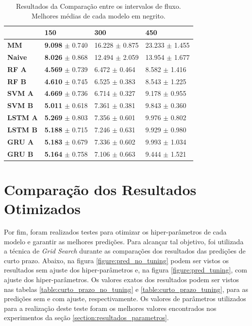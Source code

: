 \begin{table}[H]
    \begin{tabular*}{\linewidth}{@{\extracolsep{\fill}}llll}
    \toprule
     & 
    \multicolumn{1}{l}{\textbf{150}} & 
    \multicolumn{1}{l}{\textbf{300}} &
    \multicolumn{1}{l}{\textbf{450}} \\
    \midrule
    \textbf{MM} & \textbf{9.098} $\pm$ 0.740 & 16.228 $\pm$ 0.875 & 23.233 $\pm$ 1.455
    \\
    \midrule
    \textbf{Naive} & \textbf{8.026} $\pm$ 0.868 & 12.494 $\pm$ 2.059 & 13.954 $\pm$ 1.677
    \\
    \midrule
    \textbf{RF A} & \textbf{4.569} $\pm$ 0.739 & 6.472 $\pm$ 0.464 & 8.582 $\pm$ 1.416
    \\
    \midrule
    \textbf{RF B} & \textbf{4.610} $\pm$ 0.745 & 6.525 $\pm$ 0.383 & 8.543 $\pm$ 1.225
    \\
    \midrule
    \textbf{SVM A} & \textbf{4.669} $\pm$ 0.736 & 6.714 $\pm$ 0.327 & 9.178 $\pm$ 0.955
    \\
    \midrule
    \textbf{SVM B} & \textbf{5.011} $\pm$ 0.618 & 7.361 $\pm$ 0.381 & 9.843 $\pm$ 0.360
    \\
    \midrule
    \textbf{LSTM A} & \textbf{5.269} $\pm$ 0.803 & 7.356 $\pm$ 0.601 & 9.976 $\pm$ 0.802
    \\
    \midrule
    \textbf{LSTM B} & \textbf{5.188} $\pm$ 0.715 & 7.246 $\pm$ 0.631 & 9.929 $\pm$ 0.980
    \\
    \midrule
    \textbf{GRU A} & \textbf{5.183} $\pm$ 0.679 & 7.336 $\pm$ 0.602 & 9.993 $\pm$ 1.034
    \\
    \midrule
    \textbf{GRU B} & \textbf{5.164} $\pm$ 0.758 & 7.106 $\pm$ 0.663 & 9.444 $\pm$ 1.521
    \\
    \bottomrule
    \end{tabular*}
    \label{table:res_flow}
    \caption{Resultados da Comparação entre os intervalos de fluxo. Melhores médias de cada modelo em negrito.}
\end{table}

\section{Comparação dos Resultados Otimizados}

 Por fim, foram realizados testes para otimizar os hiper-parâmetros de cada modelo e garantir as melhores predições. Para alcançar tal objetivo, foi utilizada a técnica de \textit{Grid Search} durante as comparações dos resultados das predições de curto prazo. Abaixo, na figura \ref{figure:pred_no_tuning} podem ser vistos os resultados sem ajuste dos hiper-parâmetros e, na figura \ref{figure:pred_tuning}, com ajuste dos hiper-parâmetros. Os valores exatos dos resultados podem ser vistos nas tabelas  \ref{table:curto_prazo_no_tuning} e \ref{table:curto_prazo_tuning}, para as predições sem e com ajuste, respectivamente. Os valores de parâmetros utilizados para a realização deste teste foram os melhores valores encontrados nos experimentos da seção \ref{section:resultados_parametros}.
 

